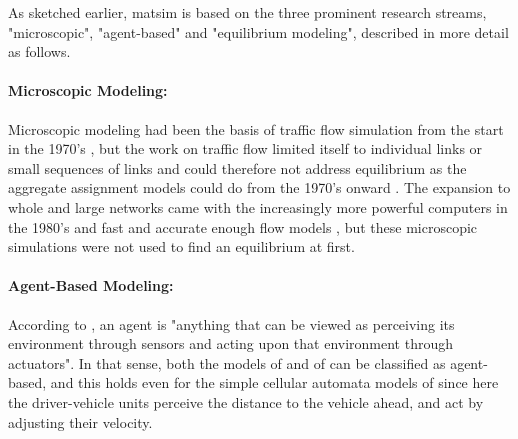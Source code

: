
As sketched earlier, \gls{matsim} is based on the three prominent research streams, "microscopic", "agent-based" and "equilibrium modeling", described in more detail as follows.

\paragraph{Microscopic Modeling:} 
Microscopic modeling had been the basis of traffic flow simulation from the start in the 1970’s \citep[e.g.,][]{Wiedemann_PhDThesis_1974, Seddon_Simulation_1972}, but the work on traffic flow limited itself to individual links or small sequences of links and could therefore not address equilibrium as the aggregate assignment models could do from the 1970’s onward \citep[see][]{OrtuzarWillumsen_2011}. The expansion to whole and large networks came with the increasingly more powerful computers in the 1980’s and fast and accurate enough flow models \citep[e.g.,][]{Schwerdtfeger_VolmulerHamerslag_1984,NagelSchreckenberg1992CA,Daganzo_TransResPartB_1994}, but these 
microscopic simulations were not used to find an \gls{equilibrium} at first. 

\paragraph{Agent-Based Modeling:} 
According to \citet[][p.~53]{RusselNorvig2010ArtificialIntelligence}, an \gls{agent} is "anything that can be viewed as perceiving its environment through sensors and acting upon that environment through actuators". In that sense, both the models of \citet{Seddon_Simulation_1972} and of \citet{Wiedemann_PhDThesis_1974} can be classified as agent-based, and this holds even for the simple cellular automata models of \citet{NagelSchreckenberg1992CA} since here the driver-vehicle units perceive the distance to the vehicle ahead, and act by adjusting their velocity.  

